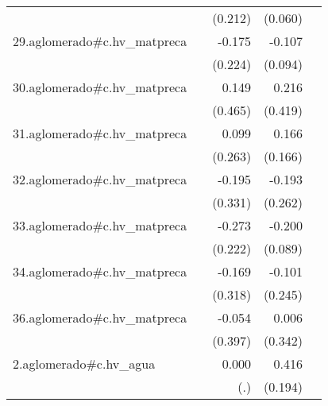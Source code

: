 {\begin{longtable}{l*{4}{D{.}{.}{-1}}}
            &                     &     (0.212)         &     (0.060)         &                     \\
\addlinespace
29.aglomerado#c.hv\_matpreca&                     &      -0.175         &      -0.107         &                     \\
            &                     &     (0.224)         &     (0.094)         &                     \\
\addlinespace
30.aglomerado#c.hv\_matpreca&                     &       0.149         &       0.216         &                     \\
            &                     &     (0.465)         &     (0.419)         &                     \\
\addlinespace
31.aglomerado#c.hv\_matpreca&                     &       0.099         &       0.166         &                     \\
            &                     &     (0.263)         &     (0.166)         &                     \\
\addlinespace
32.aglomerado#c.hv\_matpreca&                     &      -0.195         &      -0.193         &                     \\
            &                     &     (0.331)         &     (0.262)         &                     \\
\addlinespace
33.aglomerado#c.hv\_matpreca&                     &      -0.273         &      -0.200\sym{*}  &                     \\
            &                     &     (0.222)         &     (0.089)         &                     \\
\addlinespace
34.aglomerado#c.hv\_matpreca&                     &      -0.169         &      -0.101         &                     \\
            &                     &     (0.318)         &     (0.245)         &                     \\
\addlinespace
36.aglomerado#c.hv\_matpreca&                     &      -0.054         &       0.006         &                     \\
            &                     &     (0.397)         &     (0.342)         &                     \\
\addlinespace
2.aglomerado#c.hv\_agua&                     &       0.000         &       0.416\sym{*}  &                     \\
            &                     &         (.)         &     (0.194)         &                     \\

\end{longtable}}
